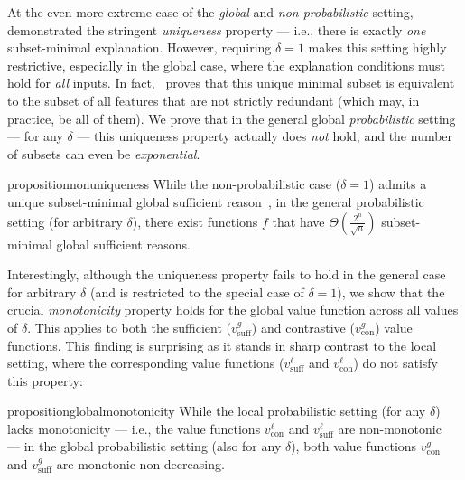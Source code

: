 \documentclass{article}
\begin{document}
At the even more extreme case of the \emph{global} and \emph{non-probabilistic} setting,~\cite{bassanlocal} demonstrated the stringent \emph{uniqueness} property --- i.e., there is exactly \emph{one} subset-minimal explanation. However, requiring $\delta=1$ makes this setting highly restrictive, especially in the global case, where the explanation conditions must hold for \emph{all} inputs. In fact,~\cite{bassanlocal} proves that this unique minimal subset is equivalent to the subset of all features that are not strictly redundant (which may, in practice, be all of them). We prove that in the general global \emph{probabilistic} setting --- for any $\delta$ --- this uniqueness property actually does \emph{not} hold, and the number of subsets can even be \emph{exponential}.%

\begin{restatable}{proposition}{nonuniqueness} \label{nonuniqueness_prop}
While the non-probabilistic case ($\delta = 1$) admits a unique subset-minimal global sufficient reason~\citep{bassanlocal}, in the general probabilistic setting (for arbitrary $\delta$), there exist functions $f$ that have $\Theta (\frac{2^n}{\sqrt{n}})$ subset-minimal global sufficient reasons.
\end{restatable}

Interestingly, although the uniqueness property fails to hold in the general case for arbitrary $\delta$ (and is restricted to the special case of $\delta=1$), we show that the crucial \emph{monotonicity} property holds for the global value function across all values of $\delta$. This applies to both the sufficient ($v^g_{\text{suff}}$) and contrastive ($v^g_{\text{con}}$) value functions. This finding is surprising as it stands in sharp contrast to the local setting, where the corresponding value functions ($v^{\ell}_{\text{suff}}$ and $v^{\ell}_{\text{con}}$) do not satisfy this property:

\begin{restatable}{proposition}{globalmonotonicity} \label{globalmonotonicity_prop}
While the local probabilistic setting (for any $\delta$) lacks monotonicity --- i.e., the value functions $v^{\ell}_{\text{con}}$ and $v^{\ell}_{\text{suff}}$ are non-monotonic~\citep{arenas2022computing, izza2023computing, subercaseaux2024probabilistic, izza2024locally} --- in the global probabilistic setting (also for any $\delta$), both value functions $v^g_{\text{con}}$ and $v^g_{\text{suff}}$ are monotonic non-decreasing.
\end{restatable}
\end{document}
